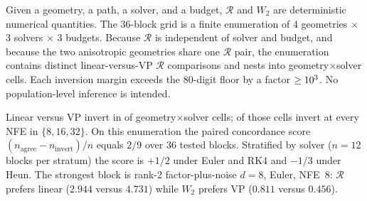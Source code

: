 \documentclass[11pt,a4paper]{article}
\newcommand{\numRlinStrong}{2.944}
\newcommand{\numRvpStrong}{4.731}
\newcommand{\numWlinStrong}{0.811}
\newcommand{\numWvpStrong}{0.456}
\theoremstyle{remark}
\newcommand{\wtwo}{W_2}
\newcommand{\cR}{\mathcal{R}}
\begin{document}
\begin{table}[t]
  \centering
  \caption{Experimental grid. Headline $\cR$ is the continuous integral.
  ``Confirmatory'' means reproduced on a frozen grid; ``post-hoc'' means
  added after the Phase~3 observation. The Gaussian drift and $\wtwo$
  formula are closed form; multimode $\cR$ is adaptive quadrature.}
  \label{tab:setup}
  \setlength{\tabcolsep}{3pt}
  \small
\end{table}

Given a geometry, a path, a solver, and a budget, $\cR$ and $\wtwo$ are
deterministic numerical quantities. The $36$-block grid is a finite
enumeration of $4$ geometries $\times$ $3$ solvers $\times$ $3$ budgets.
Because $\cR$ is independent of solver and budget, and because the two
anisotropic geometries share one $\cR$ pair, the enumeration contains
\nDistinctRComparisons{} distinct linear-versus-VP $\cR$ comparisons and
nests into \nGeometrySolverCells{} geometry$\times$solver cells. Each
inversion margin exceeds the $80$-digit floor by a factor
$\ge10^{3}$. No population-level inference is intended.

Linear versus VP invert in \nInversionCells{} of \nGeometrySolverCells{}
geometry$\times$solver cells; \nAllNFEInvertCells{} of those cells invert
at every NFE in $\{8,16,32\}$. On this enumeration the paired
concordance score $(n_{\mathrm{agree}}-n_{\mathrm{invert}})/n$ equals
$2/9$ over $36$ tested blocks. Stratified by solver ($n=12$ blocks per
stratum) the score is $+1/2$ under Euler and RK4 and $-1/3$ under Heun.
The strongest block is rank-2 factor-plus-noise $d=8$, Euler, NFE~$8$:
$\cR$ prefers linear ($\numRlinStrong$ versus $\numRvpStrong$) while
$\wtwo$ prefers VP ($\numWlinStrong$ versus $\numWvpStrong$).
\end{document}
